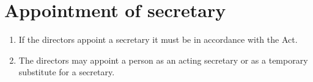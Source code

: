 \section{Appointment of secretary}

\begin{enumerate}[label=(\alph*)]
    \item If the directors appoint a secretary it must be in accordance with the Act.
    
    \item The directors may appoint a person as an acting secretary or as a temporary substitute for a secretary.
\end{enumerate} 